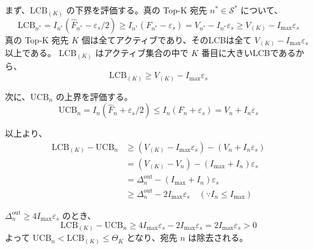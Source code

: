 \documentclass[conference]{IEEEtran}
\begin{document}
まず、$\mathrm{LCB}_{(K)}$ の下界を評価する。真の Top-K 宛先 $n^* \in \mathcal{S}^*$ について、
\begin{equation}
    \mathrm{LCB}_{n^*} = I_{n^*} (\hat{F}_{n^*} - \varepsilon_s/2) \ge I_{n^*} (F_{n^*} - \varepsilon_s) = V_{n^*} - I_{n^*} \varepsilon_s \ge V_{(K)} - I_{\max} \varepsilon_s
\end{equation}
真の Top-K 宛先 $K$ 個は全てアクティブであり、そのLCBは全て $V_{(K)} - I_{\max} \varepsilon_s$ 以上である。
$\mathrm{LCB}_{(K)}$ はアクティブ集合の中で $K$ 番目に大きいLCBであるから、
\begin{equation}
    \mathrm{LCB}_{(K)} \ge V_{(K)} - I_{\max} \varepsilon_s
\end{equation}

次に、$\mathrm{UCB}_n$ の上界を評価する。
\begin{equation}
    \mathrm{UCB}_n = I_n (\hat{F}_n + \varepsilon_s/2) \le I_n (F_n + \varepsilon_s) = V_n + I_n \varepsilon_s
\end{equation}

以上より、
\begin{align}
    \mathrm{LCB}_{(K)} - \mathrm{UCB}_n &\ge (V_{(K)} - I_{\max} \varepsilon_s) - (V_n + I_n \varepsilon_s) \\
    &= (V_{(K)} - V_n) - (I_{\max} + I_n) \varepsilon_s \\
    &= \Delta_n^{\mathrm{out}} - (I_{\max} + I_n) \varepsilon_s \\
    &\ge \Delta_n^{\mathrm{out}} - 2 I_{\max} \varepsilon_s \quad (\because I_n \le I_{\max})
\end{align}

$\Delta_n^{\mathrm{out}} \ge 4 I_{\max} \varepsilon_s$ のとき、
\begin{equation}
    \mathrm{LCB}_{(K)} - \mathrm{UCB}_n \ge 4 I_{\max} \varepsilon_s - 2 I_{\max} \varepsilon_s = 2 I_{\max} \varepsilon_s > 0
\end{equation}
よって $\mathrm{UCB}_n < \mathrm{LCB}_{(K)} \le \Theta_K$ となり、宛先 $n$ は除去される。
\end{document}
